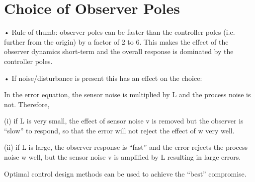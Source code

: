 







 
\section*{Choice of Observer Poles} %
\label{sec:choice_of_observer_poles}


•	Rule of thumb:   observer poles can be faster than the controller poles (i.e. further from the origin) by a factor of 2 to 6. This makes the effect of the observer dynamics short-term and the overall response is dominated by the controller poles.

•	If noise/disturbance is present this has an effect on the choice:
 

In the error equation, the sensor noise is multiplied by L and the process noise is not. Therefore,

 
(i)  if  L  is very small, the effect of sensor noise  v  is removed but the observer is “slow” to respond, so that the error will not reject the effect of  w  very well.

(ii)	if  L  is large, the observer response is “fast” and the error rejects the process noise  w  well, but the sensor noise  v  is amplified by  L  resulting in large errors.

Optimal control design methods can be used to achieve the “best” compromise.




\endinput

